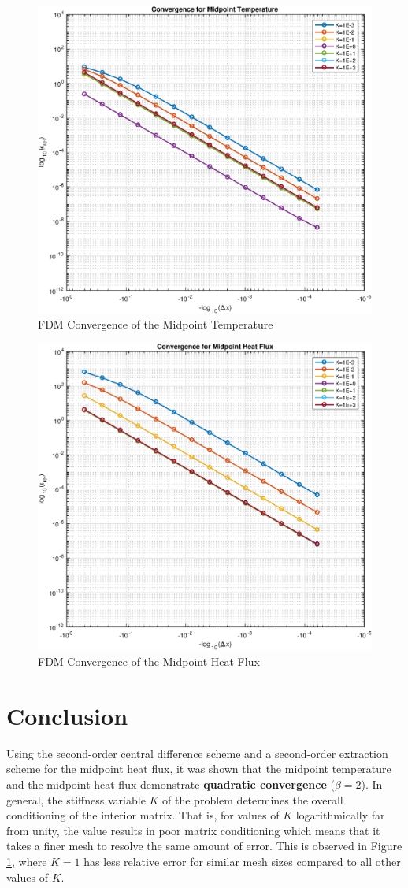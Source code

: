 \documentclass[10pt]{article}
\begin{document}
\begin{figure}[H]
	\begin{center}
		\includegraphics[width=0.6\linewidth]{convergence_u12}
		\caption{FDM Convergence of the Midpoint Temperature}
		\label{fig:conv_temp}
	\end{center}
\end{figure}


\newpage

\begin{figure}[H]
	\begin{center}
		\includegraphics[width=0.6\linewidth]{convergence_Q12}
		\caption{FDM Convergence of the Midpoint Heat Flux}
		\label{fig:conv_flux}
	\end{center}
\end{figure}


\newpage

\section*{Conclusion}

Using the second-order central difference scheme and a second-order extraction scheme for the midpoint heat flux, it was shown that the midpoint temperature and the midpoint heat flux demonstrate \textbf{quadratic convergence} ($\beta = 2$). In general, the stiffness variable $K$ of the problem determines the overall conditioning of the interior matrix. That is, for values of $K$ logarithmically far from unity, the value results in poor matrix conditioning which means that it takes a finer mesh to resolve the same amount of error. This is observed in Figure \ref{fig:conv_temp}, where $K=1$ has less relative error for similar mesh sizes compared to all other values of $K$.
\end{document}
